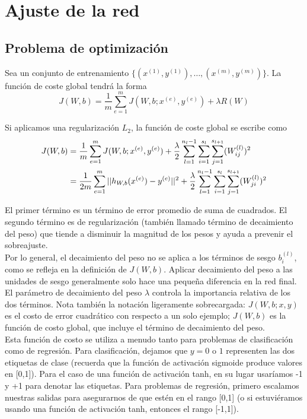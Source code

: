 \section{Ajuste de la red}

\subsection{Problema de optimización}

Sea un conjunto de entrenamiento $\{(x^{(1)}, y^{(1)}), \ldots, (x^{(m)}, y^{(m)})\}$. La función de coste global tendrá la forma 
\begin{equation}
J(W, b) = \frac{1}{m} \sum_{e = 1}^m J(W, b; x^{(e)}, y^{(e)}) + \lambda R(W)
\end{equation}

\noindent Si aplicamos una regularización $L_2$, la función de coste global se escribe como
\begin{align}
J(W, b) &= \frac{1}{m} \sum_{e = 1}^m J(W, b; x^{(e)}, y^{(e)}) + \frac{\lambda}{2} \sum_{l = 1}^{n_l - 1} \sum_{i = 1}^{s_l} \sum_{j = 1}^{s_{l+1}} (W_{ij}^{(l)})^2 \notag \\
&= \frac{1}{2m} \sum_{e = 1}^m ||h_{W, b}(x^{(e)}) - y^{(e)}||^2 + \frac{\lambda}{2} \sum_{l = 1}^{n_l - 1} \sum_{i = 1}^{s_l} \sum_{j = 1}^{s_{l+1}} (W_{ji}^{(l)})^2
\end{align} 

El primer término es un término de error promedio de suma de cuadrados. El segundo término es de regularización (también llamado término de decaimiento del peso) que tiende a disminuir la magnitud de los pesos y ayuda a prevenir el sobreajuste. \\

Por lo general, el decaimiento del peso no se aplica a los términos de sesgo $b^{(l)}_i$, como se refleja en la definición de $J(W,b)$. Aplicar decaimiento del peso a las unidades de sesgo generalmente solo hace una pequeña diferencia en la red final. \\

El parámetro de decaimiento del peso $\lambda$ controla la importancia relativa de los dos términos. Nota también la notación ligeramente sobrecargada: $J(W,b;x,y)$ es el costo de error cuadrático con respecto a un solo ejemplo; $J(W,b)$ es la función de costo global, que incluye el término de decaimiento del peso. \\

Esta función de costo se utiliza a menudo tanto para problemas de clasificación como de regresión. Para clasificación, dejamos que $y=0$ o $1$ representen las dos etiquetas de clase (recuerda que la función de activación sigmoide produce valores en [0,1]). Para el caso de una función de activación tanh, en su lugar usaríamos -1 y +1 para denotar las etiquetas. Para problemas de regresión, primero escalamos nuestras salidas para asegurarnos de que estén en el rango [0,1] (o si estuviéramos usando una función de activación tanh, entonces el rango [-1,1]). \\

